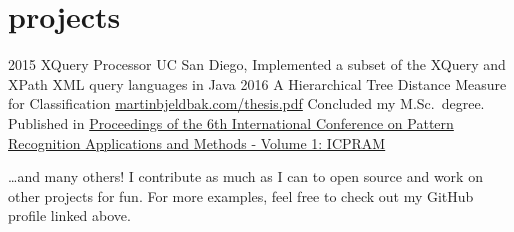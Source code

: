 \documentclass{friggeri-cv}
\begin{document}
\section{projects}
\begin{entrylist}
  \entry
    {2015}
    {XQuery Processor}
    {UC San Diego, }
    {Implemented a subset of the XQuery and XPath XML query languages in Java}
  \entry
    {2016}
    {A Hierarchical Tree Distance Measure for Classification}
    {\href{http://martinbjeldbak.com/thesis.pdf}{martinbjeldbak.com/thesis.pdf}}
    {Concluded my M.Sc.\ degree. Published in \href{http://www.scitepress.org/DigitalLibrary/PublicationsDetail.aspx?ID=xSe8tY7QfHE=&t=1}{Proceedings of the 6th International Conference on Pattern Recognition Applications and Methods - Volume 1: ICPRAM}}
\end{entrylist}

\dots and many others! I contribute as much as I can to open source and work on other projects for fun. For more examples, feel free to check out my GitHub profile linked above.
\end{document}

